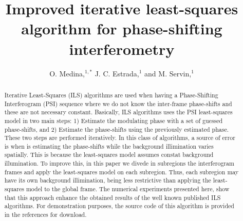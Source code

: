 \documentclass[letterpaper,12pt]{article}   %
\begin{document}
\title{Improved iterative least-squares algorithm for phase-shifting
  interferometry}

\author{O. Medina,$^{1,*}$ J. C. Estrada,$^{1}$ and M. Servin,$^{1}$}

\address{$^1$Centro de Investigaciones en Optica A. C., Loma del
  bosque 115, Col. Lomas del Campestre, Leon Guanajuato, 37150,
  Mexico}

\address{$^*$Corresponding author: orlandomedina@cio.mx}

\maketitle

\begin{abstract}
  Iterative Least-Squares (ILS) algorithms are used when having a
  Phase-Shifting Interferogram (PSI) sequence where we do not know the
  inter-frame phase-shifts and these are not necessary
  constant. Basically, ILS algorithms uses the PSI least-squares model
  in two main steps: 1) Estimate the modulating phase with a set of
  guessed phase-shifts, and 2) Estimate the phase-shifts using the
  previously estimated phase. These two steps are performed
  iteratively. In this class of algorithms, a source of error is when
  is estimating the phase-shifts while the background illimination
  varies spatially. This is because the least-squares model assumes
  constat background illumination. To improve this, in this paper we
  divede in subregions the interferogram frames and apply the
  least-squares model on each subregion. Thus, each subregion may have
  its own background illimination, being less restrictive than
  applying the least-squares model to the global frame. The numerical
  experiments presented here, show that this approach enhance the
  obtained results of the well known published ILS algorithms. For
  demonstration purposes, the source code of this algorithm is provided
  in the references for download.
\end{abstract}
\end{document}
